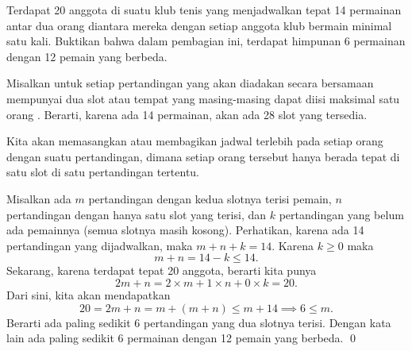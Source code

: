 \documentclass[11pt]{scrartcl}
\begin{document}
	\begin{soaljawab} Terdapat 20 anggota di suatu klub tenis yang menjadwalkan tepat 14 permainan antar dua orang diantara mereka dengan setiap anggota klub bermain minimal satu kali. Buktikan bahwa dalam pembagian ini, terdapat himpunan 6 permainan dengan 12 pemain yang berbeda.\\
	
	\begin{solusi}
		Misalkan untuk setiap pertandingan yang akan diadakan secara bersamaan mempunyai dua slot atau tempat yang masing-masing dapat diisi maksimal satu orang . Berarti, karena ada 14 permainan, akan ada 28 slot yang tersedia.
		
		Kita akan memasangkan atau membagikan jadwal terlebih pada setiap orang dengan suatu pertandingan, dimana setiap orang tersebut hanya berada tepat di satu slot di satu pertandingan tertentu. 
		
		
		 Misalkan ada $m$ pertandingan dengan kedua slotnya terisi pemain, $n$ pertandingan dengan hanya satu slot yang terisi, dan $k$ pertandingan yang belum ada pemainnya (semua slotnya masih kosong). Perhatikan, karena ada 14 pertandingan yang dijadwalkan, maka $m+n+k=14$. Karena $k \ge 0$ maka $$m+n=14-k \le 14.$$
		 Sekarang, karena terdapat tepat 20 anggota, berarti kita punya $$2m+n=2\times m+1 \times n+0 \times k =20.$$ Dari sini, kita akan mendapatkan $$20=2m+n=m+(m+n) \le m + 14 \implies 6 \le m.$$ Berarti ada paling sedikit 6 pertandingan yang dua slotnya terisi. Dengan kata lain ada paling sedikit 6 permainan dengan 12 pemain yang berbeda. \qed
	\end{solusi}
	\end{soaljawab}
	
\end{document}
